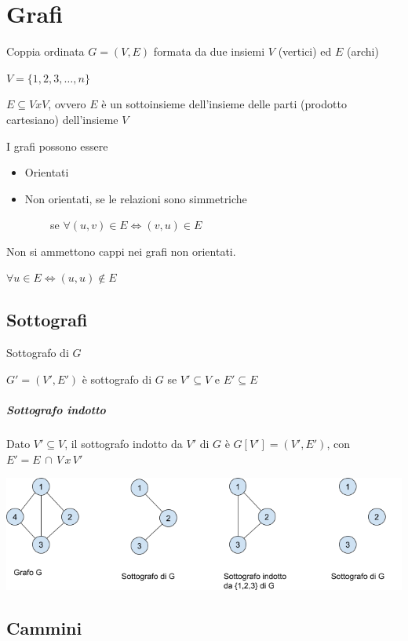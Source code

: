 \chapter{Grafi}

{Coppia ordinata $G=(V,E)$ formata da due insiemi $V$ (vertici) ed $E$ (archi)}

$V = \{1,2,3,\ldots,n\}$

{$E \subseteq VxV$, ovvero $E$ è un sottoinsieme dell'insieme delle parti (prodotto cartesiano) dell'insieme $V$}

{I grafi possono essere}

\begin{itemize}
\tightlist
\item
  {Orientati}
\item
  {Non orientati, se le relazioni sono simmetriche}
\end{itemize}

{~~~~~~~~se $\forall(u,v) \in E \iff (v,u) \in E$}

{Non si ammettono cappi nei grafi non orientati.}

$\forall u \in E \iff (u,u) \notin E$

\section{Sottografi}

{Sottografo di $G$}

{$G'=(V',E')$ è sottografo di $G$ se $V'\subseteq V$ e $E'\subseteq E$}

\paragraph{Sottografo indotto}

{Dato $V' \subseteq V$, il sottografo indotto da $V'$ di $G$ è $G[V']=(V',E')$, con $E' = E\,\cap\,V\,x\,V'$}

\includegraphics{images/image534.png}

\section{Cammini}

